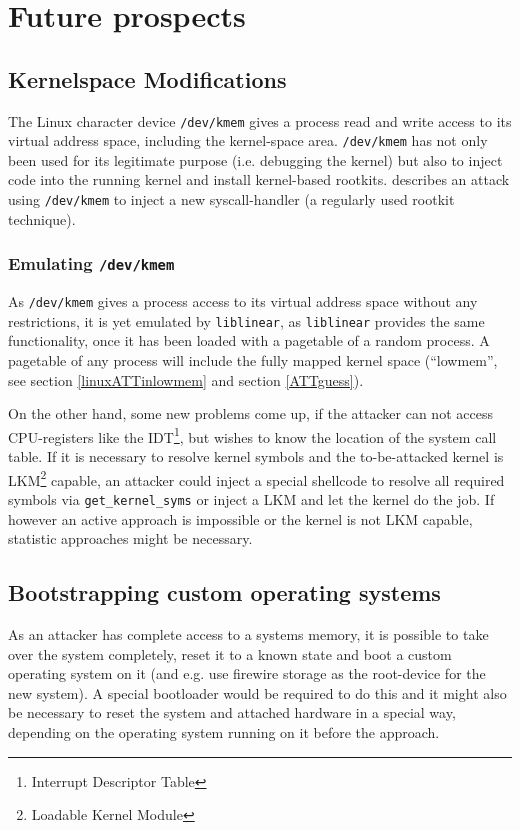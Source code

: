 %
%

\section{Future prospects}

\label{prospects}

\subsection{Kernelspace Modifications}

The Linux character device \texttt{/dev/kmem} gives a process read and write
access to its virtual address space, including the kernel-space area.
\texttt{/dev/kmem} has not only been used for its legitimate purpose (i.e\@.
debugging the kernel) but also to inject code into the running kernel and
install kernel-based rootkits. \cite{phrack58.7:2001} describes an attack using
\texttt{/dev/kmem} to inject a new syscall-handler (a regularly used rootkit
technique).

\subsubsection{Emulating \texttt{/dev/kmem}}

As \texttt{/dev/kmem} gives a process access to its virtual address space
without any restrictions, it is yet emulated by \texttt{liblinear}, as
\texttt{liblinear} provides the same functionality, once it has been loaded with
a pagetable of a random process. A pagetable of any process will include the
fully mapped kernel space (``lowmem'', see section \ref{linuxATTinlowmem} and
section \ref{ATTguess}).

On the other hand, some new problems come up, if the attacker can not access
CPU-registers like the IDT\footnote{Interrupt Descriptor Table}, but wishes to
know the location of the system call table. If it is necessary to resolve kernel
symbols and the to-be-attacked kernel is LKM\footnote{Loadable Kernel Module}
capable, an attacker could inject a special shellcode to resolve all required
symbols via \texttt{get\_kernel\_syms} or inject a LKM and let the kernel do the
job. If however an active approach is impossible or the kernel is not LKM
capable, statistic approaches might be necessary.

\subsection{Bootstrapping custom operating systems}

As an attacker has complete access to a systems memory, it is possible to take
over the system completely, reset it to a known state and boot a custom
operating system on it (and e.g\@. use firewire storage as the root-device for
the new system). A special bootloader would be required to do this and it might
also be necessary to reset the system and attached hardware in a special way,
depending on the operating system running on it before the approach.

